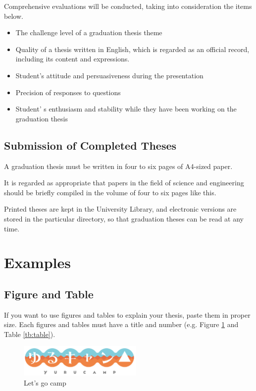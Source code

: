 \documentclass[ams]{U-AizuGT}
\begin{document}
			Comprehensive evaluations will be conducted, taking into consideration the items below.
			
			\begin{itemize}
				\setlength{\parskip}{0cm}
				\setlength{\itemsep}{0cm}
				\item The challenge level of a graduation thesis theme
				\item Quality of a thesis written in English, which is regarded as an official record, including its content and expressions. 
				\item Student's attitude and persuasiveness during the presentation
				\item Precision of responses to questions
				\item Student' s enthusiasm and stability while they have been working on the graduation thesis
			\end{itemize}
			
		\subsection{Submission of Completed Theses}
			A graduation thesis must be written in four to six pages of A4-sized paper. 
			
			It is regarded as appropriate that papers in the field of science and engineering should be briefly compiled in the volume of four to six pages like this.
			
			Printed theses are kept in the University Library, and electronic versions are stored in the particular directory, so that graduation theses can be read at any time.
			
	\section{Examples}
		\subsection{Figure and Table}
			If you want to use figures and tables to explain your thesis, paste them in proper size. Each figures and tables must have a title and number (e.g. Figure \ref{fig:logo} and Table \ref{tb:table}).
			
			\begin{figure}[htb]
				\centering
				\includegraphics[width=6cm]{img/yurucamp.jpg}
				\caption{Let's go camp}
				\label{fig:logo} %
			\end{figure}
			
\end{document}
